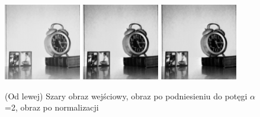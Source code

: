 \documentclass[final,a4paper,openany,12pt]{mwbk}
\begin{document}
\begin{figure}[H]
	\begin{center}
		\includegraphics[width=0.3\textwidth]{1/1Gray_Pow_Original}
		\includegraphics[width=0.3\textwidth]{1/1Gray_Pow_Result}
		\includegraphics[width=0.3\textwidth]{1/1Gray_Pow_Result_Norm}
	\end{center}
	\caption{(Od lewej) Szary obraz wejściowy, obraz po podniesieniu do potęgi $\alpha$=2, obraz po normalizacji }
\end{figure}
\end{document}
